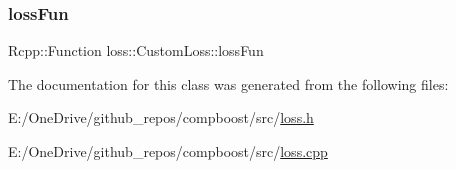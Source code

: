 \mbox{\label{classloss_1_1_custom_loss_a90aa6d3240cd14bc3ede21af38b70c8a}} 
\subsubsection{\texorpdfstring{loss\+Fun}{lossFun}}
{\footnotesize\ttfamily Rcpp\+::\+Function loss\+::\+Custom\+Loss\+::loss\+Fun\hspace{0.3cm}{\ttfamily [private]}}



The documentation for this class was generated from the following files\+:\begin{DoxyCompactItemize}
\item 
E\+:/\+One\+Drive/github\+\_\+repos/compboost/src/\mbox{\hyperlink{loss_8h}{loss.\+h}}\item 
E\+:/\+One\+Drive/github\+\_\+repos/compboost/src/\mbox{\hyperlink{loss_8cpp}{loss.\+cpp}}\end{DoxyCompactItemize}
